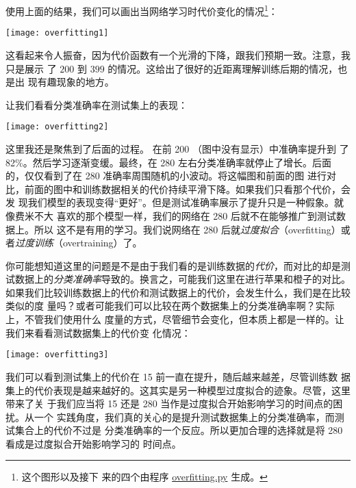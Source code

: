使用上面的结果，我们可以画出当网络学习时代价变化的情况\footnote{这个图形以及接下
  来的四个由程序
  \href{https://github.com/mnielsen/neural-networks-and-deep-learning/blob/master/fig/overfitting.py}{overfitting.py}
  生成。}：
\begin{center}
  \texttt{[image: overfitting1]}
\end{center}
  
这看起来令人振奋，因为代价函数有一个光滑的下降，跟我们预期一致。注意，我只是展示
了 $200$ 到 $399$ \epoch{}的情况。这给出了很好的近距离理解训练后期的情况，也是出
现有趣现象的地方。

让我们看看分类准确率在测试集上的表现：
\begin{center}
  \texttt{[image: overfitting2]}
\end{center}

这里我还是聚焦到了后面的过程。 在前 200 \epochs{}（图中没有显示）中准确率提升到
了 82\%。然后学习逐渐变缓。最终，在 280 \epoch{}左右分类准确率就停止了增长。后面
的\epochs{}，仅仅看到了在 280 \epoch{}准确率周围随机的小波动。将这幅图和前面的图
进行对比，前面的图中和训练数据相关的代价持续平滑下降。如果我们只看那个代价，会发
现我们模型的表现变得“更好”。但是测试准确率展示了提升只是一种假象。就像费米不大
喜欢的那个模型一样，我们的网络在 280 \epoch{}后就不在能够推广到测试数据上。所以
这不是有用的学习。我们说网络在 280 \epoch{}后就\emph{过度拟合}（overfitting）或者\emph{过度训练}（overtraining）了。

你可能想知道这里的问题是不是由于我们看的是训练数据的\emph{代价}，而对比的却是测
试数据上的\emph{分类准确率}导致的。换言之，可能我们这里在进行苹果和橙子的对比。
如果我们比较训练数据上的代价和测试数据上的代价，会发生什么，我们是在比较类似的度
量吗？或者可能我们可以比较在两个数据集上的分类准确率啊？实际上，不管我们使用什么
度量的方式，尽管细节会变化，但本质上都是一样的。让我们来看看测试数据集上的代价变
化情况：
\begin{center}
  \texttt{[image: overfitting3]}
\end{center}

我们可以看到测试集上的代价在 15 \epoch{}前一直在提升，随后越来越差，尽管训练数
据集上的代价表现是越来越好的。这其实是另一种模型过度拟合的迹象。尽管，这里带来了关
于我们应当将 15 还是 280 \epoch{}当作是过度拟合开始影响学习的时间点的困扰。从一个
实践角度，我们真的关心的是提升测试数据集上的分类准确率，而测试集合上的代价不过是
分类准确率的一个反应。所以更加合理的选择就是将 280 \epoch{}看成是过度拟合开始影响学习的
时间点。

